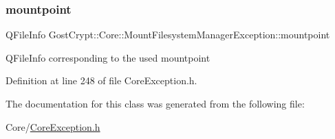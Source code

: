 \subsubsection{\texorpdfstring{mountpoint}{mountpoint}}
{\footnotesize\ttfamily Q\+File\+Info Gost\+Crypt\+::\+Core\+::\+Mount\+Filesystem\+Manager\+Exception\+::mountpoint\hspace{0.3cm}{\ttfamily [protected]}}

Q\+File\+Info corresponding to the used mountpoint 

Definition at line 248 of file Core\+Exception.\+h.



The documentation for this class was generated from the following file\+:\begin{DoxyCompactItemize}
\item 
Core/\hyperlink{_core_exception_8h}{Core\+Exception.\+h}\end{DoxyCompactItemize}
